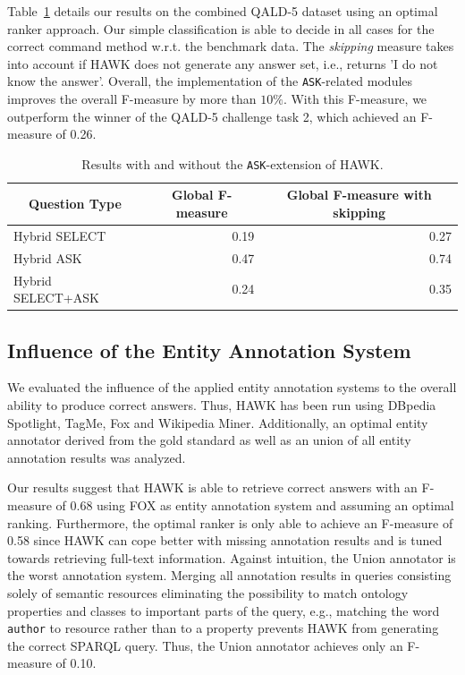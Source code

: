 Table~\ref{tab:eval_ask} details our results on the combined \ac{QALD}-5 dataset using an optimal ranker approach. 
Our simple classification is able to decide in all cases for the correct command method w.r.t. the benchmark data.
The \emph{skipping} measure takes into account if HAWK does not generate any answer set, i.e., returns 'I do not know the answer'.
Overall, the implementation of the \texttt{ASK}-related modules improves the overall F-measure by more than $10\%$. With this F-measure, we outperform the winner of the \ac{QALD}-5 challenge task 2, which achieved an F-measure of 0.26. 


\begin{table}[htb!]
\centering
\begin{tabular}{@{}lrr@{}}
\toprule
\multicolumn{1}{c}{{\bf Question Type}} & \multicolumn{1}{c}{{\bf Global F-measure}} & \multicolumn{1}{c}{{\bf Global F-measure with skipping}} \\ \midrule
Hybrid SELECT                           & 0.19                                       & 0.27                                                     \\
Hybrid ASK                              & 0.47                                       & 0.74                                                     \\
Hybrid SELECT+ASK                       & 0.24                                       & 0.35                                                     \\ \bottomrule
\end{tabular}
\caption{Results with and without the \texttt{ASK}-extension of HAWK.}
\label{tab:eval_ask}
\end{table}


\subsection{Influence of the Entity Annotation System}
We evaluated the influence of the applied entity annotation systems to the overall ability to produce correct answers.
Thus, HAWK has been run using DBpedia Spotlight, TagMe, Fox and Wikipedia Miner. %
Additionally, an optimal entity annotator derived from the gold standard as well as an union of all entity annotation results was analyzed. 

Our results suggest that HAWK is able to retrieve correct answers with an F-measure of 0.68 using FOX as entity annotation system and assuming an optimal ranking.
Furthermore, the optimal ranker is only able to achieve an F-measure of 0.58 since HAWK can cope better with missing annotation results and is tuned towards retrieving full-text information.
Against intuition, the Union annotator is the worst annotation system. 
Merging all annotation results in queries consisting solely of semantic resources eliminating the possibility to match ontology properties and classes to important parts of the query, e.g., matching the word \texttt{author} to resource rather than to a property prevents HAWK from generating the correct SPARQL query.
Thus, the Union annotator achieves only an F-measure of 0.10.

